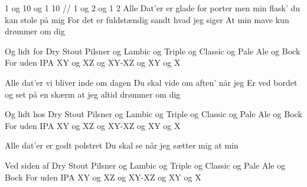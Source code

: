 1 og 10 og 1 10                 // 1 og 2 og 1 2
Alle Dat'er er glade for porter
men min flask' du kan stole på mig
For det er fuldstændig sandt hvad jeg siger
At min mave kun drømmer om dig

Og lidt for Dry Stout
Pilsner og Lambic
og Triple og Classic
og Pale Ale og Bock
For uden IPA
XY og XZ
og XY-XZ
og XY og X

Alle dat'er vi bliver inde om dagen
Du skal vide om aften' når jeg
Er ved bordet og set på en skærm
at jeg altid drømmer om dig

Og lidt hos Dry Stout
Pilsner og Lambic
og Triple og Classic
og Pale Ale og Bock
For uden IPA
XY og XZ
og XY-XZ
og XY og X

Alle dat'er er godt polstret
Du skal se når jeg sætter mig
at min 


Ved siden af Dry Stout
Pilsner og Lambic
og Triple og Classic
og Pale Ale og Bock
For uden IPA
XY og XZ
og XY-XZ
og XY og X